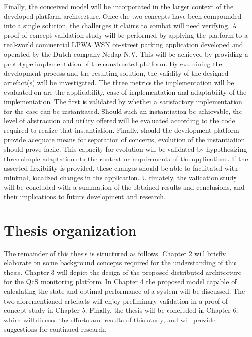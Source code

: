Finally, the conceived model will be incorporated in the larger context of the developed platform architecture. Once the two concepts have been compounded into a single solution, the challenges it claims to combat will need verifying. A proof-of-concept validation study will be performed by applying the platform to a real-world commercial LPWA WSN on-street parking application developed and operated by the Dutch company Nedap N.V. This will be achieved by providing a prototype implementation of the constructed platform. By examining the development process and the resulting solution, the validity of the designed artefact(s) will be investigated. The three metrics the implementation will be evaluated on are the applicability, ease of implementation and adaptability of the implementation. The first is validated by whether a satisfactory implementation for the case can be instantiated. Should such an instantiation be achievable, the level of abstraction and utility offered will be evaluated according to the code required to realize that instantiation. Finally, should the development platform provide adequate means for separation of concerns, evolution of the instantiation should prove facile. This capacity for evolution will be validated by hypothesizing three simple adaptations to the context or requirements of the applications. If the asserted flexibility is provided, these changes should be able to facilitated with minimal, localized changes in the application. Ultimately, the validation study will be concluded with a summation of the obtained results and conclusions, and their implications to future development and research.

\section{Thesis organization}
The remainder of this thesis is structured as follows. Chapter 2 will briefly elaborate on some background concepts required for the understanding of this thesis. Chapter 3 will depict the design of the proposed distributed architecture for the QoS monitoring platform. In Chapter 4 the proposed model capable of calculating the state and optimal performance of a system will be discussed. The two aforementioned artefacts will enjoy preliminary validation in a proof-of-concept study in Chapter 5. Finally, the thesis will be concluded in Chapter 6, which will discuss the efforts and results of this study, and will provide suggestions for continued research.

